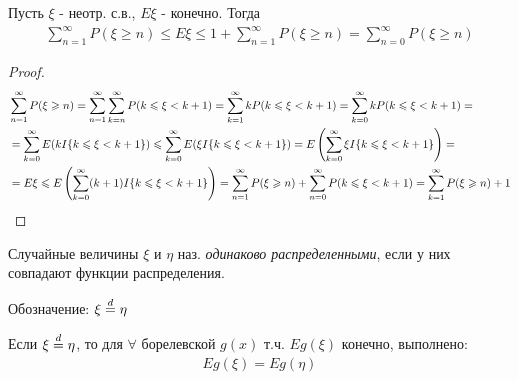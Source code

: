
\begin{lemma}
  Пусть $\xi$ - неотр. с.в., $E\xi$ - конечно.
  Тогда
  \begin{align*}
    \sum_{n = 1}^{\infty} P(\xi \geq n) \leq E \xi \leq 1 + \sum_{n = 1}^{\infty} P(\xi \geq n) = 
    \sum_{n = 0}^{\infty} P(\xi \geq n)
  \end{align*}
\end{lemma}


\begin{proof}
  \begin{align*}
    &\sum_{n = 1}^{\infty} P(\xi \geqslant n)
    = \sum_{n = 1}^{\infty} \sum_{k = n}^{\infty} P(k \leqslant \xi < k + 1)
    = \sum_{k = 1}^{\infty} k P(k \leqslant \xi < k + 1) 
    = \sum_{k = 0}^{\infty} k P(k \leqslant \xi < k + 1) =\\
    &= \sum_{k = 0}^{\infty} E(k I \{ k \leqslant \xi < k + 1 \}) 
    \leqslant \sum_{k = 0}^{\infty} E(\xi I \{ k \leqslant \xi < k + 1 \})
    = E \left( \sum_{k = 0}^{\infty} \xi I \{ k \leqslant \xi < k + 1 \} \right) = \\
    &= E \xi \leqslant E\left( \sum_{k = 0}^{\infty} (k + 1) I \{ k \leqslant \xi < k + 1 \} \right)
    = \sum_{n = 1}^{\infty} P(\xi \geqslant n) + \sum_{n = 0}^{\infty} P(k \leqslant \xi < k + 1)  
    = \sum_{k = 1}^{\infty} P(\xi \geqslant n) + 1
  \end{align*}
\end{proof}

\begin{definition}
  Случайные величины $\xi$ и $\eta$ наз. \emph{одинаково распределенными}, 
  если у них совпадают функции распределения. 

  Обозначение: $\xi \stackrel{d}{=} \eta$
\end{definition}

\begin{statement}
  Если $\xi \stackrel{d}{=} \eta$, то для $\forall$ борелевской $g(x)$ т.ч. 
  $E g(\xi)$ конечно, выполнено:
  \begin{align*}
    E g(\xi) = E g(\eta)
  \end{align*}
\end{statement}

